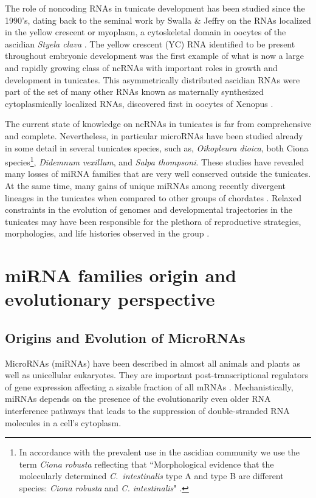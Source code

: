 \documentclass[graybox]{svmult}
\begin{document}
The role of noncoding RNAs in tunicate development has been studied since
the 1990's, dating back to the seminal work by Swalla \& Jeffry on the RNAs
localized in the yellow crescent or myoplasm, a cytoskeletal domain in
oocytes of the ascidian \textit{Styela clava} \citep{Swalla1995}. The yellow
crescent (YC) RNA identified to be present throughout embryonic development
was the first example of what is now a large and rapidly growing class of
ncRNAs with important roles in growth and development in tunicates. This
asymmetrically distributed ascidian RNAs were part of the set of many other
RNAs known as maternally synthesized cytoplasmically localized RNAs,
discovered first in oocytes of Xenopus \citep{Bashirullah1998}.

The current state of knowledge on ncRNAs in tunicates is far from
comprehensive and complete. Nevertheless, in particular microRNAs have been
studied already in some detail in several tunicates species, such as,
\textit{Oikopleura dioica}, both Ciona species\footnote{In accordance with
  the prevalent use in the ascidian community we use the term \textit{Ciona
    robusta} reflecting that ``Morphological evidence that the molecularly
  determined \textit{C.\ intestinalis} type A and type B are different
  species: \textit{Ciona robusta} and \textit{C.  intestinalis}"
  \citep{Brunetti:2015}.}, \textit{Didemnum vexillum}, and \textit{Salpa
  thompsoni}. These studies have revealed many losses of miRNA families that
are very well conserved outside the tunicates. At the same time, many gains
of unique miRNAs among recently divergent lineages in the tunicates when
compared to other groups of chordates \citep{Fu:08,
  Velandia-Huerto2016}. Relaxed constraints in the evolution of genomes and
developmental trajectories in the tunicates may have been responsible for
the plethora of reproductive strategies, morphologies, and life histories
observed in the group \citep{Holland2015}.

\section{miRNA families origin and evolutionary perspective}
\label{sec:2}

\subsection{Origins and Evolution of MicroRNAs}

MicroRNAs (miRNAs) have been described in almost all animals and plants as
well as unicellular eukaryotes. They are important post-transcriptional
regulators of gene expression affecting a sizable
fraction of all mRNAs \citep{Ameres:13}. Mechanistically, miRNAs depends on
the presence of the evolutionarily even older RNA interference pathways
\citep{Cerutti:06, Shabalina:08} that leads to the suppression of
double-stranded RNA molecules in a cell's cytoplasm.
\end{document}
